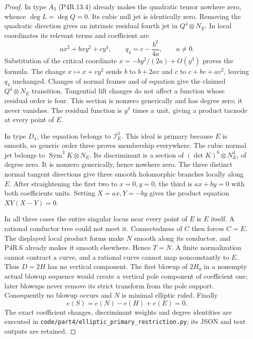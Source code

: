 \begin{proof}
In type $A_3$ (P4R.13.4) already makes the
quadratic tensor nowhere zero, whence
$\deg L=\deg Q=0$. Its cubic null jet is
identically zero. Removing the quadratic
direction gives an intrinsic residual fourth
jet in $Q^4\otimes N_E$. In local coordinates
its relevant terms and coefficient are
\[
 a x^2+bxy^2+cy^4,
 \qquad q_4=c-\frac{b^2}{4a},\qquad a\ne0.                 \tag{P4R.13.5}
\]
Substitution of the critical coordinate
$x=-by^2/(2a)+O(y^3)$ proves the formula.
The change $x\mapsto x+vy^2$ sends $b$ to
$b+2av$ and $c$ to $c+bv+av^2$, leaving
$q_4$ unchanged. Changes of normal frames
and of equation give the claimed
$Q^4\otimes N_E$ transition. Tangential
lift changes do not affect a function
whose residual order is four. This section
is nonzero generically and has degree zero;
it never vanishes. The residual function
is $y^4$ times a unit, giving a product
tacnode at every point of $E$.

In type $D_4$, the equation belongs to
$\mathcal I_E^3$. This ideal is primary
because $E$ is smooth, so generic order
three proves membership everywhere.
The cubic normal jet belongs to
$\operatorname{Sym}^3K\otimes N_E$.
Its discriminant is a section of
$(\det K)^6\otimes N_E^4$, of degree
zero. It is nonzero generically, hence
nowhere zero. The three distinct normal
tangent directions give three smooth
holomorphic branches locally along $E$.
After straightening the first two to
$x=0,y=0$, the third is $ax+by=0$
with both coefficients units. Setting
$X=ax,Y=-by$ gives the product equation
$XY(X-Y)=0$.

In all three cases the entire singular
locus near every point of $E$ is $E$
itself. A rational conductor tree could
not meet it. Connectedness of $C$ then
forces $C=E$. The displayed local
product forms make $N$ smooth along
its conductor, and P4R.6 already makes
it smooth elsewhere. Hence $T=N$.
A finite normalization cannot contract
a curve, and a rational curve cannot
map nonconstantly to $E$. Thus $D=2H$
has no vertical component. The first
blowup of $2H_0$ in a nonempty actual
blowup sequence would create a vertical
pole component of coefficient one;
later blowups never remove its strict
transform from the pole support.
Consequently no blowup occurs and $N$
is minimal elliptic ruled. Finally
\[
 e(S)=e(N)-e(H)+e(E)=0.
\]
The exact coefficient changes, discriminant
weights and degree identities are executed
in \texttt{code/part4/elliptic\_primary\_restriction.py};
its JSON and text outputs are retained.
\end{proof}
